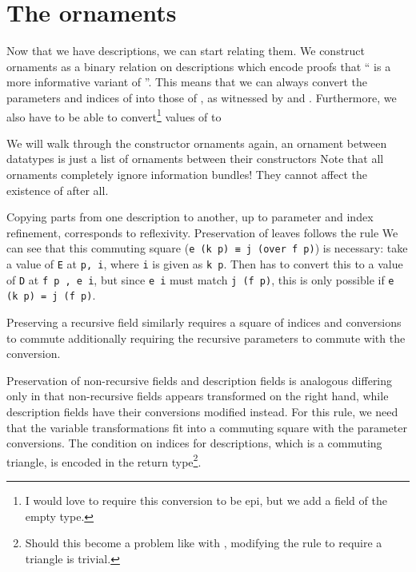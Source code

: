 \section{\added{}The ornaments}
Now that we have descriptions, we can start relating them. We construct ornaments as a binary relation on descriptions
which encode proofs that `` is a more informative variant of ''. This means that we can always convert the parameters and indices of  into those of , as witnessed by  and . Furthermore, we also have to be able to convert\footnote{I would love to require this conversion to be epi, but we add a field of the empty type.} values of  to 

We will walk through the constructor ornaments
again, an ornament between datatypes is just a list of ornaments between their constructors
Note that all ornaments completely ignore information bundles! They cannot affect the existence of  after all.

Copying parts from one description to another, up to parameter and index refinement, corresponds to reflexivity. Preservation of leaves follows the rule
We can see that this commuting square (\texttt{e (k p) ≡ j (over f p)}) is necessary: take a value of \texttt{E} at \texttt{p, i}, where \texttt{i} is given as \texttt{k p}. Then  has to convert this to a value of \texttt{D} at \texttt{f p , e i}, but since \texttt{e i} must match \texttt{j (f p)}, this is only possible if \texttt{e (k p) = j (f p)}.

Preserving a recursive field similarly requires a square of indices and conversions to commute
additionally requiring the recursive parameters to commute with the conversion. 

Preservation of non-recursive fields and description fields is analogous
differing only in that non-recursive fields appears transformed on the right hand, while description fields have their conversions modified instead. For this rule, we need that the variable transformations fit into a commuting square with the parameter conversions. The condition on indices for descriptions, which is a commuting triangle, is encoded in the return type\footnote{Should this become a problem like with , modifying the rule to require a triangle is trivial.}.

